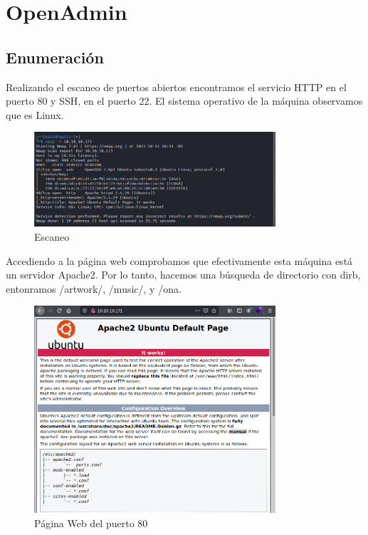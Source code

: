 \documentclass{article}
\begin{document}


\clearpage
\tableofcontents
\clearpage
\section{OpenAdmin}
\subsection{Enumeración}

Realizando el escaneo de puertos abiertos encontramos el servicio HTTP en el puerto 80 y SSH, en el puerto 22. El sistema operativo de la máquina observamos que es Linux.
\begin{figure}[h]
	\center
	\includegraphics[width=0.8\textwidth]{images/openadmin/1-escaneo.png}
	\caption{Escaneo}
\end{figure}

Accediendo a la página web comprobamos que efectivamente esta máquina está un servidor Apache2. Por lo tanto, hacemos una búsqueda de directorio con dirb, entonramos /artwork/, /music/, y /ona.
\begin{figure}[h]
	\center
	\includegraphics[width=0.8\textwidth]{images/openadmin/2-paginaweb.png}
	\caption{Página Web del puerto 80}
\end{figure}
\end{document}
